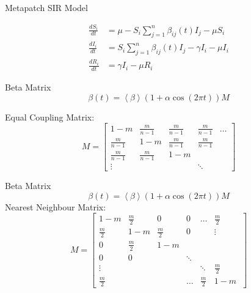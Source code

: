\documentclass{beamer}\usepackage[]{graphicx}\usepackage[]{color}
\begin{document}
  \begin{frame}{Metapatch SIR Model}
  \begin{center}
\begin{align*}
  \frac{dS_i}{dt} &= \mu - S_i\sum\limits_{j=1}^{n}\beta_{ij}(t) I_j -\mu S_i \\ 
  \frac{dI_i}{dt} &= S_i\sum\limits_{j=1}^{n}\beta_{ij}(t) I_j -\gamma I_i - \mu I_i \\
  \frac{dR_i}{dt} &= \gamma I_i -\mu R_i
\end{align*}
\end{center}
   \end{frame}
   
   \begin{frame}{Beta Matrix}
    \begin{equation*}
  \beta(t) = \left < \beta \right > (1+\alpha \cos(2\pi t))M
\end{equation*}

Equal Coupling Matrix:
  \[
M =
\begin{bmatrix}
  1-m & \frac{m}{n-1} & \frac{m}{n-1} & \frac{m}{n-1} & \dots \\
  \frac{m}{n-1} & 1-m & \frac{m}{n-1} & \frac{m}{n-1}  \\
  \frac{m}{n-1} & \frac{m}{n-1} & 1-m &  \\
  \vdots &  &  & \ddots 
\end{bmatrix}
\]

  \end{frame}
  
  \begin{frame}{Beta Matrix}
    \begin{equation*}
  \beta(t) = \left < \beta \right > (1+\alpha \cos(2\pi t))M
\end{equation*}
Nearest Neighbour Matrix:
  \[
M =
\begin{bmatrix}
  1-m & \frac{m}{2} & 0 & 0 & \dots & \frac{m}{2} \\
  \frac{m}{2} & 1-m & \frac{m}{2} & 0 & & \vdots \\
  0 & \frac{m}{2} & 1-m &  \\
  0 & 0 & & \ddots \\
  \vdots & & & & \ddots & \frac{m}{2} \\
  \frac{m}{2} &  & & \dots & \frac{m}{2} & 1-m \ 
\end{bmatrix}
\]
  \end{frame}
  
\end{document}
